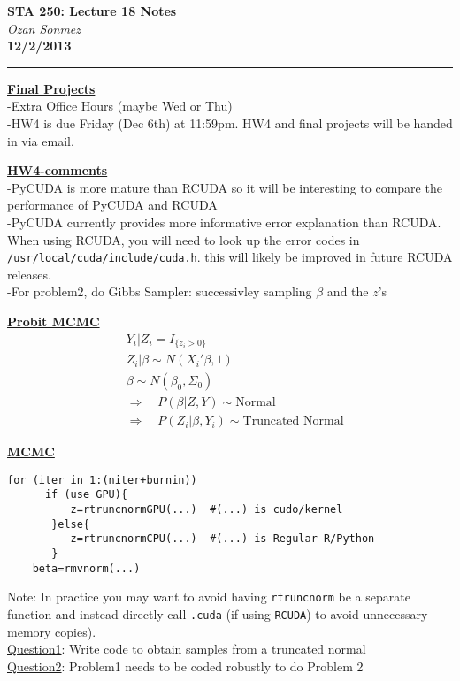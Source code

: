 \documentclass[a4paper, 11pt]{report}
\begin{document}
\begin{center}
\LARGE
\textbf{STA 250: Lecture 18 Notes} \\
\LARGE
   \emph{Ozan Sonmez}\\
\textbf{12/2/2013}
\end{center}
\vspace{-.2in}
\noindent\rule{\textwidth}{2pt}
\normalsize


\bigskip

 \underline{\bf {Final Projects}} \normalsize \\
-Extra Office Hours (maybe Wed or Thu)\\
-HW4 is due Friday (Dec 6th) at 11:59pm. HW4 and final projects will be handed in via email.

\bigskip

 \underline{\bf {HW4-comments}} \normalsize \\
-PyCUDA is more mature than RCUDA so it will be interesting to compare the performance of PyCUDA and RCUDA\\
-PyCUDA currently provides more informative error explanation than RCUDA. When using RCUDA, you will need to look up the error codes in \texttt{/usr/local/cuda/include/cuda.h}. this will likely be improved in future RCUDA releases.\\
-For problem2, do Gibbs Sampler: successivley sampling $\beta$ and the $z$'s

\bigskip

\underline{\bf {Probit MCMC}} \normalsize \\

\begin{equation}
\begin{aligned}
&Y_i|Z_i=I_{\{z_i>0\}}\\
&Z_i|\beta \sim N(X_i'\beta,1)\\
&\beta \sim N(\beta_{0},\Sigma_0)\\
&\Rightarrow \quad P(\beta|Z,Y)\sim \text{Normal}\\
&\Rightarrow \quad P(Z_i|\beta,Y_i) \sim \text{Truncated Normal}
\end{aligned} \nonumber
\end{equation}

\underline{\bf {MCMC}} \normalsize \\

\begin{verbatim}
for (iter in 1:(niter+burnin))
      if (use GPU){
          z=rtruncnormGPU(...)  #(...) is cudo/kernel
       }else{
          z=rtruncnormCPU(...)  #(...) is Regular R/Python
       }
    beta=rmvnorm(...)
\end{verbatim}
Note: In practice you may want to avoid having \texttt{rtruncnorm} be a separate function and instead directly call \texttt{.cuda} (if using \texttt{RCUDA}) to avoid unnecessary memory copies).\\
\underline{Question1}: Write code to obtain samples from a truncated normal\\
\underline{Question2}: Problem1 needs to be coded robustly to do Problem 2\\
\end{document}
